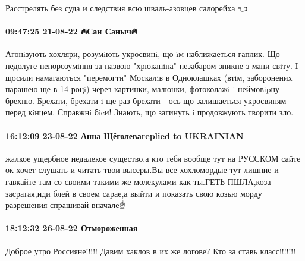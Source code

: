 Расстрелять без суда и следствия всю шваль-азовцев салорейха🤪👈

\paragraph{09:47:25 21-08-22 🔥Сан Саныч🔥}

Агонiзують хохляри, розумiють укросвинi, що ïм наближаеться гаплик. Що недолуге непорозумiння за назвою "хрюканiна" незабаром зникне з мапи свiту. I щосили намагаються "перемогти" Москалiв в Одноклашках (втiм, заборонених парашею ще в 14 роцi) через картинки, малюнки, фотоколажi i неймовipну брехню.
Брехати, брехати i ще раз брехати - ось що залишаеться укросвиням перед кiнцем.
Справжнi бicи! Знають, що загинуть i продовжують творити зло.

\paragraph{16:12:09 23-08-22 Анна Щёголеваreplied to UKRAINIAN}

жалкое ущербное недалекое существо,а кто тебя вообще тут на РУССКОМ сайте ок
хочет слушать и читать твои высеры.Вы все хохломордые тут лишние и гавкайте там
со своими такими же молекулами как ты.ГЕТЬ ПШЛА,коза засратая,иди блей в своем
сарае,а выйти и показать свою козью морду разрешения спрашивай вначале☝

\paragraph{18:12:32 26-08-22 Отмороженная 🤘🤘🤘}

Доброе утро Россияне!!!!!
Давим хаклов в их же логове?
Кто за ставь класс!!!!!!!
